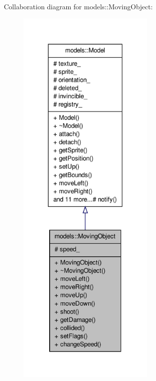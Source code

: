 \-Collaboration diagram for models\-:\-:\-Moving\-Object\-:\nopagebreak
\begin{figure}[H]
\begin{center}
\leavevmode
\includegraphics[height=550pt]{db/dd0/classmodels_1_1MovingObject__coll__graph}
\end{center}
\end{figure}
